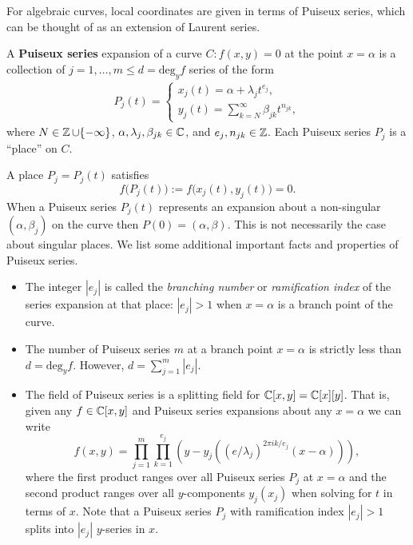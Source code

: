 For algebraic curves, local coordinates are given in terms of Puiseux series,
which can be thought of as an extension of Laurent series.
\begin{definition} \label{def: puiseux} A {\bf Puiseux series} expansion of a
  curve $C : f(x,y) = 0$ at the point $x=\alpha$ is a collection of $j =
  1,\ldots,m \leq d = \text{deg}_y f$ series of the form
  \begin{align*}
    P_j(t) =
    \begin{cases}
      x_j(t) = \alpha + \lambda_j t^{e_j}, \\
      y_j(t) = \sum_{k=N}^\infty \beta_{jk} t^{n_{jk}},
    \end{cases}
  \end{align*}
  where $N \in \operatorname{\mathbb{Z}} \cup \{-\infty\}$, $\alpha, \lambda_j, \beta_{jk} \in \operatorname{\mathbb{C}}$,
  and $e_j,n_{jk} \in \operatorname{\mathbb{Z}}$. Each Puiseux series $P_j$ is a ``place'' on $C$.
\end{definition}
A place $P_j = P_j(t)$ satisfies
\[
    f\big(P_j(t)\big) := f\big(x_j(t), y_j(t)\big) = 0.
\]
When a Puiseux series $P_j(t)$ represents an expansion about a non-singular
$(\alpha, \beta_j)$ on the curve then $P(0) = (\alpha,\beta)$. This is not
necessarily the case about singular places. We list some additional important
facts and properties of Puiseux series.
\begin{itemize}
\item The integer $|e_j|$ is called the {\it branching number} or {\it
    ramification index} of the series expansion at that place: $|e_j| > 1$ when
  $x = \alpha$ is a branch point of the curve.
\item The number of Puiseux series $m$ at a branch point $x = \alpha$ is
  strictly less than $d = \text{deg}_y f$. However, $d = \sum_{j=1}^m |e_j|$.
\item The field of Puiseux series is a splitting field for $\operatorname{\mathbb{C}}[x,y] =
  \operatorname{\mathbb{C}}[x][y]$. That is, given any $f \in \operatorname{\mathbb{C}}[x,y]$ and Puiseux series expansions
  about any $x=\alpha$ we can write
  \[
    f(x,y) = \prod_{j=1}^m \prod_{k=1}^{e_j} \left( y - y_j\left(
             (e/\lambda_j)^{2 \pi ik / e_j}(x-\alpha) \right) \right),
  \]
  where the first product ranges over all Puiseux series $P_j$ at $x=\alpha$ and
  the second product ranges over all $y$-components $y_j(x_j)$ when solving for
  $t$ in terms of $x$. Note that a Puiseux series $P_j$ with ramification index
  $|e_j|>1$ splits into $|e_j|$ $y$-series in $x$.
\end{itemize}

